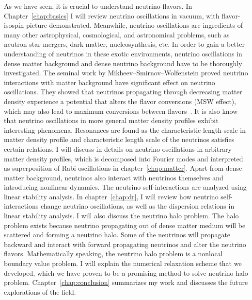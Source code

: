 As we have seen, it is crucial to understand neutrino flavors. In Chapter~\ref{chap:basics} I will review neutrino oscillations in vacuum, with flavor-isospin picture demonstrated. Meanwhile, neutrino oscillations are ingredients of many other astrophysical, cosmological, and astronomical problems, such as neutron star mergers, dark matter, nucleosynthesis, etc. In order to gain a better understanding of neutrinos in these exotic environments, neutrino oscillations in dense matter background and dense neutrino background have to be thoroughly investigated. The seminal work by Mikheev--Smirnov--Wolfenstein proved neutrino interactions with matter background have significant effect on neutrino oscillations. They showed that neutrinos propagating through decreasing matter density experience a potential that alters the flavor conversions (MSW effect), which may also lead to maximum conversions between flavors~\cite{Mikheev:1986gs,wolf78,wolfensteinprd1979}. It is also know that neutrino oscillations in more general matter density profiles exhibit interesting phenomena. Resonances are found as the characteristic length scale in matter density profile and characteristic length scale of the neutrinos satisfies certain relations. I will discuss in details on neutrino oscillations in arbitrary matter density profiles, which is decomposed into Fourier modes and interpreted as superposition of Rabi oscillations in chapter~\ref{chap:matter}. Apart from dense matter background, neutrinos also interact with neutrinos themselves and introducing nonlinear dynamics. The neutrino self-interactions are analyzed using linear stability analysis. In chapter~\ref{chap:dr}, I will review how neutrino self-interactions change neutrino oscillations, as well as the dispersion relations in linear stability analysis. I will also discuss the neutrino halo problem. The halo problem exists because neutrino propagating out of dense matter medium will be scattered and forming a neutrino halo. Some of the neutrinos will propagate backward and interact with forward propagating neutrinos and alter the neutrino flavors. Mathematically speaking, the neutrino halo problem is a nonlocal boundary value problem. I will explain the numerical relaxation scheme that we developed, which we have proven to be a promising method to solve neutrino halo problem. Chapter~\ref{chap:conclusion} summarizes my work and discusses the future explorations of the field.
